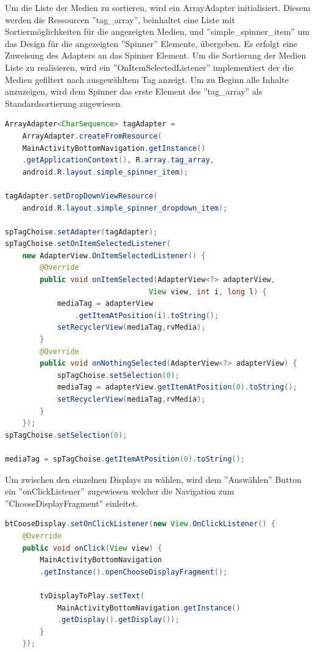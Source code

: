Um die Liste der Medien zu sortieren, wird ein ArrayAdapter initialisiert. Diesem werden die Ressourcen ''tag\_array'', beinhaltet eine Liste mit Sortiermöglichkeiten für die angezeigten Medien, und ''simple\_spinner\_item'' um das Design für die angezeigten ''Spinner'' Elemente, übergeben. Es erfolgt eine Zuweisung des Adapters an das Spinner Element. Um die Sortierung der Medien Liste zu realisieren, wird ein ''OnItemSelectedListener'' implementiert der die Medien gefiltert nach ausgewähltem Tag anzeigt. Um zu Beginn alle Inhalte anzuzeigen, wird dem Spinner das erste Element des ''tag\_array'' als Standardsortierung zugewiesen.
\begin{lstlisting}[language=Java,caption={Erstellen des Spinner und der dazugehörigen Event-Listener MediaOverviewFragment}]
ArrayAdapter<CharSequence> tagAdapter =
	ArrayAdapter.createFromResource(
    MainActivityBottomNavigation.getInstance()
    .getApplicationContext(), R.array.tag_array,
    android.R.layout.simple_spinner_item);
        
tagAdapter.setDropDownViewResource(
	android.R.layout.simple_spinner_dropdown_item);
    	
spTagChoise.setAdapter(tagAdapter);
spTagChoise.setOnItemSelectedListener(
	new AdapterView.OnItemSelectedListener() {
        @Override
        public void onItemSelected(AdapterView<?> adapterView,
        						 View view, int i, long l) {
            mediaTag = adapterView
            	.getItemAtPosition(i).toString();
            setRecyclerView(mediaTag,rvMedia);
        }
        @Override
        public void onNothingSelected(AdapterView<?> adapterView) {
            spTagChoise.setSelection(0);
            mediaTag = adapterView.getItemAtPosition(0).toString();
            setRecyclerView(mediaTag,rvMedia);
        }
    });
spTagChoise.setSelection(0);

mediaTag = spTagChoise.getItemAtPosition(0).toString();
\end{lstlisting}
Um zwischen den einzelnen Displays zu wählen, wird dem ''Auswählen'' Button ein ''onClickListener'' zugewiesen welcher die Navigation zum ''ChooseDisplayFragment'' einleitet.

\begin{lstlisting}[language=Java,caption={OnClickListener für Displayauswahl im MediaOverviewFragment}]
btCooseDisplay.setOnClickListener(new View.OnClickListener() {
   	@Override
    public void onClick(View view) {
    	MainActivityBottomNavigation
    	.getInstance().openChooseDisplayFragment();
      	
        tvDisplayToPlay.setText(
        	MainActivityBottomNavigation.getInstance()
        	.getDisplay().getDisplay());
        }
    });
\end{lstlisting}

